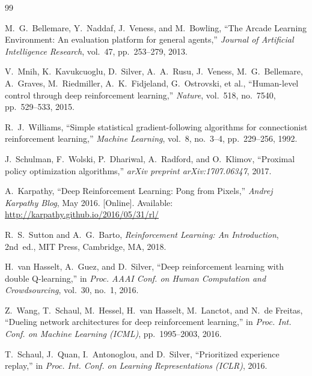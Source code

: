 \documentclass[12pt,a4paper]{report}
\begin{document}
\newpage
\begin{thebibliography}{99}

M.~G.~Bellemare, Y.~Naddaf, J.~Veness, and M.~Bowling,
``The Arcade Learning Environment: An evaluation platform for general agents,''
\textit{Journal of Artificial Intelligence Research}, vol.~47, pp.~253--279, 2013.

V.~Mnih, K.~Kavukcuoglu, D.~Silver, A.~A.~Rusu, J.~Veness, M.~G.~Bellemare, A.~Graves, M.~Riedmiller, A.~K.~Fidjeland, G.~Ostrovski, et al.,
``Human-level control through deep reinforcement learning,''
\textit{Nature}, vol.~518, no.~7540, pp.~529--533, 2015.

R.~J.~Williams,
``Simple statistical gradient-following algorithms for connectionist reinforcement learning,''
\textit{Machine Learning}, vol.~8, no.~3--4, pp.~229--256, 1992.

J.~Schulman, F.~Wolski, P.~Dhariwal, A.~Radford, and O.~Klimov,
``Proximal policy optimization algorithms,''
\textit{arXiv preprint arXiv:1707.06347}, 2017.

A.~Karpathy,
``Deep Reinforcement Learning: Pong from Pixels,''
\textit{Andrej Karpathy Blog}, May 2016. [Online]. Available: \url{http://karpathy.github.io/2016/05/31/rl/}

R.~S.~Sutton and A.~G.~Barto,
\textit{Reinforcement Learning: An Introduction},
2nd~ed., MIT Press, Cambridge, MA, 2018.

H.~van Hasselt, A.~Guez, and D.~Silver,
``Deep reinforcement learning with double Q-learning,''
in \textit{Proc. AAAI Conf. on Human Computation and Crowdsourcing}, vol.~30, no.~1, 2016.

Z.~Wang, T.~Schaul, M.~Hessel, H.~van Hasselt, M.~Lanctot, and N.~de Freitas,
``Dueling network architectures for deep reinforcement learning,''
in \textit{Proc. Int. Conf. on Machine Learning (ICML)}, pp.~1995--2003, 2016.

T.~Schaul, J.~Quan, I.~Antonoglou, and D.~Silver,
``Prioritized experience replay,''
in \textit{Proc. Int. Conf. on Learning Representations (ICLR)}, 2016.


\end{thebibliography}
\end{document}

